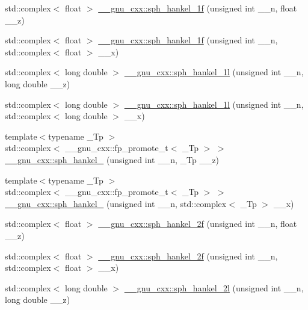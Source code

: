 \begin{DoxyCompactItemize}
\item 
std\+::complex$<$ float $>$ \hyperlink{group__mathsf__gnu_ga70d4fc01069f3f0ac0e3b52fe1dffea4}{\+\_\+\+\_\+gnu\+\_\+cxx\+::sph\+\_\+hankel\+\_\+1f} (unsigned int \+\_\+\+\_\+n, float \+\_\+\+\_\+z)
\item 
std\+::complex$<$ float $>$ \hyperlink{group__mathsf__gnu_gadbb875cd50abb62ac75386143486bb2c}{\+\_\+\+\_\+gnu\+\_\+cxx\+::sph\+\_\+hankel\+\_\+1f} (unsigned int \+\_\+\+\_\+n, std\+::complex$<$ float $>$ \+\_\+\+\_\+x)
\item 
std\+::complex$<$ long double $>$ \hyperlink{group__mathsf__gnu_ga6e77fd5cddfbd57d9120b20fc6c30e6f}{\+\_\+\+\_\+gnu\+\_\+cxx\+::sph\+\_\+hankel\+\_\+1l} (unsigned int \+\_\+\+\_\+n, long double \+\_\+\+\_\+z)
\item 
std\+::complex$<$ long double $>$ \hyperlink{group__mathsf__gnu_ga3e9d889d8f2e4792e892b12b1f5948b9}{\+\_\+\+\_\+gnu\+\_\+cxx\+::sph\+\_\+hankel\+\_\+1l} (unsigned int \+\_\+\+\_\+n, std\+::complex$<$ long double $>$ \+\_\+\+\_\+x)
\item 
{\footnotesize template$<$typename \+\_\+\+Tp $>$ }\\std\+::complex$<$ \+\_\+\+\_\+gnu\+\_\+cxx\+::fp\+\_\+promote\+\_\+t$<$ \+\_\+\+Tp $>$ $>$ \hyperlink{group__mathsf__gnu_ga1ca08866a25e3637b04c57ff5a0c36a5}{\+\_\+\+\_\+gnu\+\_\+cxx\+::sph\+\_\+hankel\+\_} (unsigned int \+\_\+\+\_\+n, \+\_\+\+Tp \+\_\+\+\_\+z)
\item 
{\footnotesize template$<$typename \+\_\+\+Tp $>$ }\\std\+::complex$<$ \+\_\+\+\_\+gnu\+\_\+cxx\+::fp\+\_\+promote\+\_\+t$<$ \+\_\+\+Tp $>$ $>$ \hyperlink{group__mathsf__gnu_ga0e7d9b5a93ab1d1040040f0ef44590de}{\+\_\+\+\_\+gnu\+\_\+cxx\+::sph\+\_\+hankel\+\_} (unsigned int \+\_\+\+\_\+n, std\+::complex$<$ \+\_\+\+Tp $>$ \+\_\+\+\_\+x)
\item 
std\+::complex$<$ float $>$ \hyperlink{group__mathsf__gnu_ga9496b81f94b8ba0162cf45df72be1e71}{\+\_\+\+\_\+gnu\+\_\+cxx\+::sph\+\_\+hankel\+\_\+2f} (unsigned int \+\_\+\+\_\+n, float \+\_\+\+\_\+z)
\item 
std\+::complex$<$ float $>$ \hyperlink{group__mathsf__gnu_ga4c3194b71831b265811f987cbbf6e031}{\+\_\+\+\_\+gnu\+\_\+cxx\+::sph\+\_\+hankel\+\_\+2f} (unsigned int \+\_\+\+\_\+n, std\+::complex$<$ float $>$ \+\_\+\+\_\+x)
\item 
std\+::complex$<$ long double $>$ \hyperlink{group__mathsf__gnu_ga6d3ead73a4f0bfeeb0aa1fd99daaf3b1}{\+\_\+\+\_\+gnu\+\_\+cxx\+::sph\+\_\+hankel\+\_\+2l} (unsigned int \+\_\+\+\_\+n, long double \+\_\+\+\_\+z)

\end{DoxyCompactItemize}
